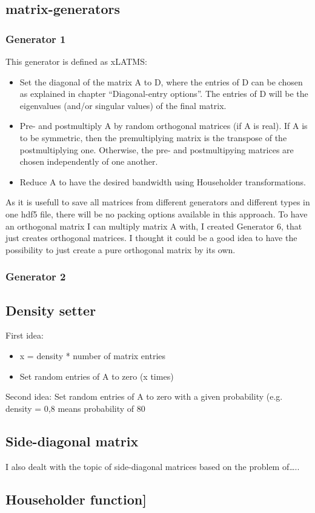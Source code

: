\documentclass[parskip=full]{scrartcl}
\begin{document}
\subsection{matrix-generators}

\subsubsection{Generator 1}
This generator is defined as xLATMS: 

\begin{itemize}
	\item Set the diagonal of the matrix A to D, where the entries of D can be chosen as explained in chapter “Diagonal-entry options”. The entries of D will be the eigenvalues (and/or singular values) of the final matrix.
	\item Pre- and postmultiply A by random orthogonal matrices (if A is real). If A is to be symmetric, then the premultiplying matrix is the transpose of the postmultiplying one. Otherwise, the pre- and postmultipying matrices are chosen independently of one another.
	\item Reduce A to have the desired bandwidth using Householder transformations.
\end{itemize}

As it is usefull to save all matrices from different generators and different types in one hdf5 file, there will be no packing options available in this approach.
To have an orthogonal matrix I can multiply matrix A with, I created Generator 6, that just creates orthogonal matrices. I thought it could be a good idea to have the possibility to just create a pure orthogonal matrix by its own.


\subsubsection{Generator 2}



\subsection{Density setter}
First idea:
\begin{itemize}
	\item x = density * number of matrix entries
	\item Set random entries of A to zero (x times)
\end{itemize}
Second idea:
Set random entries of A to zero with a given probability (e.g. density = 0,8 means probability of 80%


\subsection{Side-diagonal matrix}
I also dealt with the topic of side-diagonal matrices based on the problem of…..

\subsection{Householder function]}





\printnoidxglossaries
\end{document}
